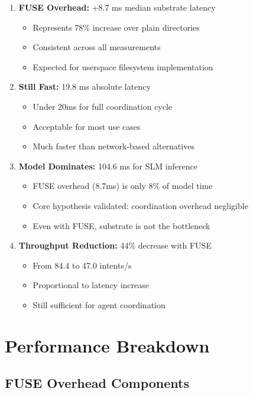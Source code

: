 \documentclass[11pt]{article}
\begin{document}
\begin{enumerate}
\item \textbf{FUSE Overhead:} +8.7 ms median substrate latency
  \begin{itemize}
  \item Represents 78\% increase over plain directories
  \item Consistent across all measurements
  \item Expected for userspace filesystem implementation
  \end{itemize}

\item \textbf{Still Fast:} 19.8 ms absolute latency
  \begin{itemize}
  \item Under 20ms for full coordination cycle
  \item Acceptable for most use cases
  \item Much faster than network-based alternatives
  \end{itemize}

\item \textbf{Model Dominates:} 104.6 ms for SLM inference
  \begin{itemize}
  \item FUSE overhead (8.7ms) is only 8\% of model time
  \item Core hypothesis validated: coordination overhead negligible
  \item Even with FUSE, substrate is not the bottleneck
  \end{itemize}

\item \textbf{Throughput Reduction:} 44\% decrease with FUSE
  \begin{itemize}
  \item From 84.4 to 47.0 intents/s
  \item Proportional to latency increase
  \item Still sufficient for agent coordination
  \end{itemize}
\end{enumerate}

\section{Performance Breakdown}

\subsection{FUSE Overhead Components}
\end{document}
